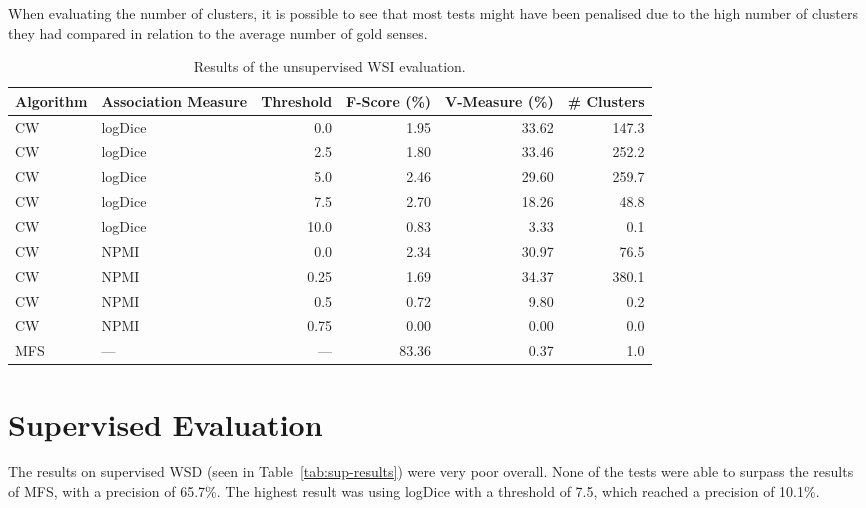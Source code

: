 When evaluating the number of clusters, it is possible to see that most tests
might have been penalised due to the high number of clusters they had compared
in relation to the average number of gold senses.

\begin{table}[ht]
\caption{Results of the unsupervised \ac*{WSI} evaluation.}
\label{tab:unsup-results}
\begin{tabu} to \textwidth {Xlrrrr}
\hline
\textbf{Algorithm} & \textbf{Association Measure} & \textbf{Threshold} & \textbf{F-Score (\%)} & \textbf{V-Measure (\%)} & \textbf{\# Clusters} \\
\hline
\ac{CW} & logDice   &  0.0 &  1.95 & 33.62 & 147.3 \\
\ac{CW} & logDice   &  2.5 &  1.80 & 33.46 & 252.2 \\
\ac{CW} & logDice   &  5.0 &  2.46 & 29.60 & 259.7 \\
\ac{CW} & logDice   &  7.5 &  2.70 & 18.26 &  48.8 \\
\ac{CW} & logDice   & 10.0 &  0.83 &  3.33 &   0.1 \\
\hline
\ac{CW} & \ac{NPMI} & 0.0  &  2.34 & 30.97 &  76.5 \\
\ac{CW} & \ac{NPMI} & 0.25 &  1.69 & 34.37 & 380.1 \\
\ac{CW} & \ac{NPMI} & 0.5  &  0.72 &  9.80 &   0.2 \\
\ac{CW} & \ac{NPMI} & 0.75 &  0.00 &  0.00 &   0.0 \\
\hline
\ac{MFS} &      --- &  --- & 83.36 &  0.37 &   1.0 \\
\hline
\end{tabu}
\end{table}

\section{Supervised Evaluation}

The results on supervised \ac{WSD} (seen in Table~\ref{tab:sup-results}) were
very poor overall. None of the tests were able to surpass the results of
\ac{MFS}, with a precision of 65.7\%. The highest result was using logDice with
a threshold of 7.5, which reached a precision of 10.1\%.

